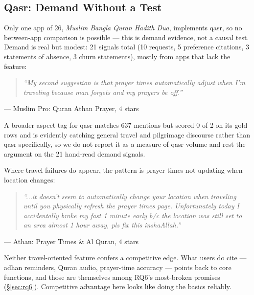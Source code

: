 \subsection{Qasr: Demand Without a Test}

Only one app of 26, \emph{Muslim Bangla Quran Hadith Dua}, implements qasr, so
no between-app comparison is possible --- this is demand evidence, not a
causal test. Demand is real but modest: 21 signals total (10 requests, 5
preference citations, 3 statements of absence, 3 churn statements), mostly
from apps that lack the feature:

\begin{quote}
\itshape ``My second suggestion is that prayer times automatically adjust when
I'm traveling because man forgets and my prayers be off.''
\end{quote}
\hspace*{1em}--- Muslim Pro: Quran Athan Prayer, 4 stars

A broader aspect tag for qasr matches 637 mentions but scored 0 of 2 on its
gold rows and is evidently catching general travel and pilgrimage discourse
rather than qasr specifically, so we do not report it as a measure of qasr
volume and rest the argument on the 21 hand-read demand signals.

Where travel failures do appear, the pattern is prayer times not updating when
location changes:

\begin{quote}
\itshape ``...it doesn't seem to automatically change your location when
traveling until you physically refresh the prayer times page. Unfortunately
today I accidentally broke my fast 1 minute early b/c the location was still
set to an area almost 1 hour away, pls fix this inshaAllah.''
\end{quote}
\hspace*{1em}--- Athan: Prayer Times \& Al Quran, 4 stars

Neither travel-oriented feature confers a competitive edge. What users do
cite --- adhan reminders, Quran audio, prayer-time accuracy --- points back to
core functions, and those are themselves among RQ6's most-broken promises
(\S\ref{sec:rq6}). Competitive advantage here looks like doing the basics
reliably.

